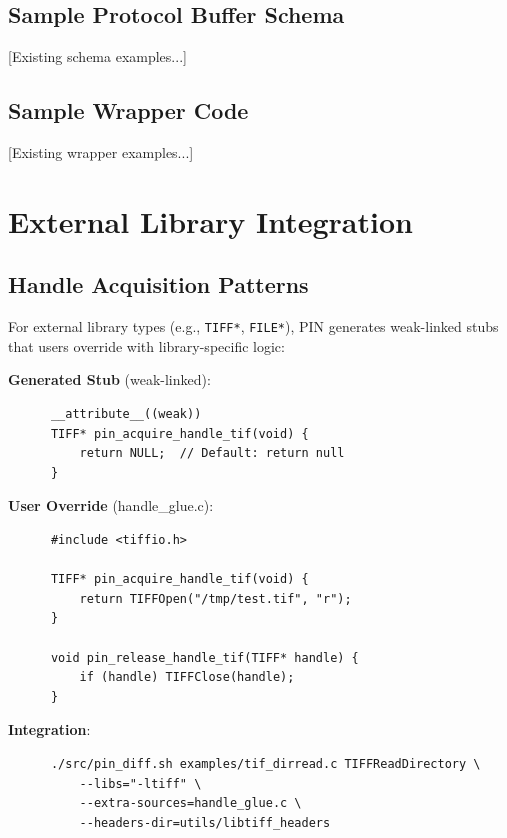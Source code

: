 \documentclass[doublespace,nopageskip]{VTthesis}
\begin{document}
\begin{appendices}
      \section{Sample Protocol Buffer Schema} \label{ase:sample_schema}
      [Existing schema examples...]

      \section{Sample Wrapper Code} \label{ase:sample_wrapper}
      [Existing wrapper examples...]

    \chapter{External Library Integration} \label{app:external_library}
      \section{Handle Acquisition Patterns}

      For external library types (e.g., \texttt{TIFF*}, \texttt{FILE*}), PIN generates weak-linked stubs that users override with library-specific logic:

      \textbf{Generated Stub} (weak-linked):
      \begin{verbatim}
      __attribute__((weak))
      TIFF* pin_acquire_handle_tif(void) {
          return NULL;  // Default: return null
      }
      \end{verbatim}

      \textbf{User Override} (handle\_glue.c):
      \begin{verbatim}
      #include <tiffio.h>

      TIFF* pin_acquire_handle_tif(void) {
          return TIFFOpen("/tmp/test.tif", "r");
      }

      void pin_release_handle_tif(TIFF* handle) {
          if (handle) TIFFClose(handle);
      }
      \end{verbatim}

      \textbf{Integration}:
      \begin{verbatim}
      ./src/pin_diff.sh examples/tif_dirread.c TIFFReadDirectory \
          --libs="-ltiff" \
          --extra-sources=handle_glue.c \
          --headers-dir=utils/libtiff_headers
      \end{verbatim}

  \end{appendices}
\end{document}
